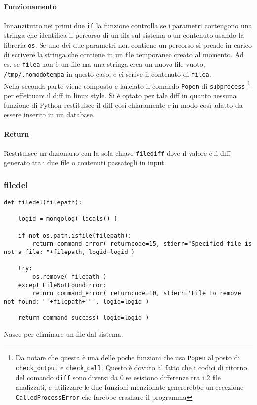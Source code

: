 \documentclass[11pt]{article}
\begin{document}
\paragraph{Funzionamento}
Innanzitutto nei primi due \texttt{if} la funzione controlla se i parametri contengono una stringa che identifica il percorso di un file sul sistema
o un contenuto usando la libreria \texttt{os}. Se uno dei due parametri non contiene un percorso si prende in carico di scrivere la stringa che contiene
in un file temporaneo creato al momento.
Ad es. se \texttt{filea} non è un file ma una stringa crea un nuovo file vuoto, \texttt{/tmp/.nomodotempa} in questo caso, e ci scrive il contenuto
di \texttt{filea}. \\
Nella seconda parte viene composto e lanciato il comando \texttt{Popen} di \texttt{subprocess}
\footnote{\label{Popenneeded} Da notare che questa è una delle poche funzioni che usa \texttt{Popen} al posto di \texttt{check\_output} e \texttt{check\_call}.
Questo è dovuto al fatto che i codici di ritorno del comando \texttt{diff} sono diversi da 0 se esistono differenze tra i 2 file analizzati, e utilizzare
le due funzioni menzionate genererebbe un eccezione \texttt{CalledProcessError} che farebbe crashare il programma}
per effettuare il diff in linux style. Si è optato per tale diff in quanto nessuna funzione di Python restituisce il diff
così chiaramente e in modo così adatto da essere inserito in un database.\\
\paragraph{Return}
Restituisce un dizionario con la sola chiave \texttt{filediff} dove il valore è il diff generato tra i due file o contenuti passatogli
in input.

\subsubsection{filedel}\label{filedel}
\begin{lstlisting}
def filedel(filepath):

    logid = mongolog( locals() )

    if not os.path.isfile(filepath):
        return command_error( returncode=15, stderr="Specified file is not a file: "+filepath, logid=logid )

    try:
        os.remove( filepath )
    except FileNotFoundError:
        return command_error( returncode=10, stderr='File to remove not found: "'+filepath+'"', logid=logid )

    return command_success( logid=logid )
\end{lstlisting}
Nasce per eliminare un file dal sistema.
\end{document}
